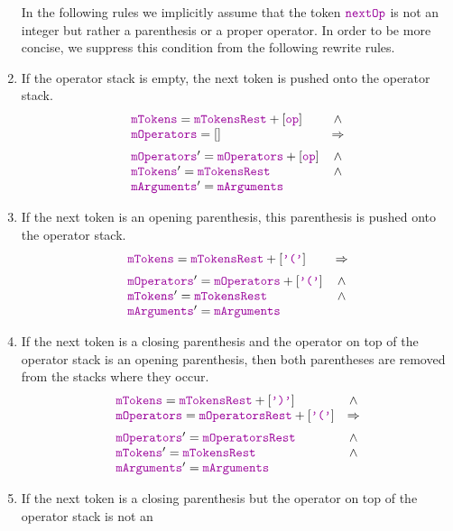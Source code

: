 \begin{enumerate}
      In the following rules we implicitly assume that the token $\mytt{nextOp}$ is not an integer but rather a parenthesis
      or a proper operator.  In order to be more concise, we suppress this condition from the following rewrite rules.
\item If the operator stack is empty, the next token is pushed onto the operator stack.
    $$\begin{array}{lc}
        \mytt{mTokens} = \mytt{mTokensRest} + [\mytt{op} ] & \wedge \\
        \mytt{mOperators} = []                                 & \Rightarrow \\[0.2cm]
        \mytt{mOperators}' = \mytt{mOperators} + [\mytt{op}] & \wedge \\
        \mytt{mTokens}' = \mytt{mTokensRest} & \wedge \\
        \mytt{mArguments}' = \mytt{mArguments} 
        \end{array} 
      $$
\item If the next token is an opening parenthesis, this parenthesis is pushed onto the operator stack.
     $$\begin{array}{lcll}
         \mytt{mTokens} = \mytt{mTokensRest} + [\mytt{'('} ] & \Rightarrow \\[0.2cm]
         \mytt{mOperators}' = \mytt{mOperators} + [\mytt{'('}] & \wedge \\
         \mytt{mTokens}' = \mytt{mTokensRest} & \wedge \\
         \mytt{mArguments}' = \mytt{mArguments} 
         \end{array} 
      $$
\item If the next token is a closing parenthesis and the operator on top of the operator stack is an opening
      parenthesis, then both parentheses are removed from the stacks where they occur.
     $$\begin{array}{lc}
         \mytt{mTokens} = \mytt{mTokensRest} + [\mytt{')'}] & \wedge \\
         \mytt{mOperators} = \mytt{mOperatorsRest} + [\mytt{'('}] & \Rightarrow \\[0.2cm]
         \mytt{mOperators}' = \mytt{mOperatorsRest} & \wedge \\
         \mytt{mTokens}' = \mytt{mTokensRest} & \wedge \\
         \mytt{mArguments}' = \mytt{mArguments} 
         \end{array} 
      $$
\item If the next token is a closing parenthesis but the operator on top of the operator stack is not an

\end{enumerate}
